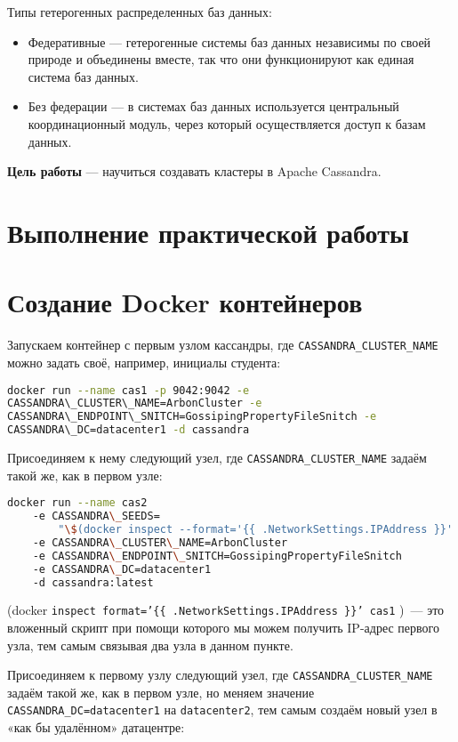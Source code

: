Типы гетерогенных распределенных баз данных:
\begin{itemize}
	\item Федеративные — гетерогенные системы баз данных независимы по
		своей природе и объединены вместе, так что они функционируют как
		единая система баз данных.
	\item Без федерации — в системах баз данных используется центральный
		координационный модуль, через который осуществляется доступ к
		базам данных.
\end{itemize}

\textbf{Цель работы} --- научиться создавать кластеры в Apache Cassandra.

\clearpage

\section*{\LARGE Выполнение практической работы}

\section{Создание Docker контейнеров}

Запускаем контейнер с первым узлом кассандры, где
\texttt{CASSANDRA\_CLUSTER\_NAME} можно задать своё, например,
инициалы студента:

\begin{lstlisting}[language=bash]
docker run --name cas1 -p 9042:9042 -e
CASSANDRA\_CLUSTER\_NAME=ArbonCluster -e
CASSANDRA\_ENDPOINT\_SNITCH=GossipingPropertyFileSnitch -e
CASSANDRA\_DC=datacenter1 -d cassandra
\end{lstlisting}

Присоединяем к нему следующий узел, где
\texttt{CASSANDRA\_CLUSTER\_NAME} задаём такой же, как в первом узле:

\begin{lstlisting}[language=bash]
docker run --name cas2
	-e CASSANDRA\_SEEDS=
		"\$(docker inspect --format='{{ .NetworkSettings.IPAddress }}' cas1)"
	-e CASSANDRA\_CLUSTER\_NAME=ArbonCluster
	-e CASSANDRA\_ENDPOINT\_SNITCH=GossipingPropertyFileSnitch
	-e CASSANDRA\_DC=datacenter1
	-d cassandra:latest
\end{lstlisting}

(docker
\texttt{inspect \-\-format='\{\{ .NetworkSettings.IPAddress \}\}' cas1}
)~--- это вложенный скрипт при помощи которого мы можем получить
IP-адрес первого узла, тем самым связывая два узла в данном пункте.\par
Присоединяем к первому узлу следующий узел, где
\texttt{CASSANDRA\_CLUSTER\_NAME} задаём такой же, как в первом узле,
но меняем значение \texttt{CASSANDRA\_DC=datacenter1} на \texttt{datacenter2},
тем самым создаём новый узел в «как бы удалённом» датацентре:

